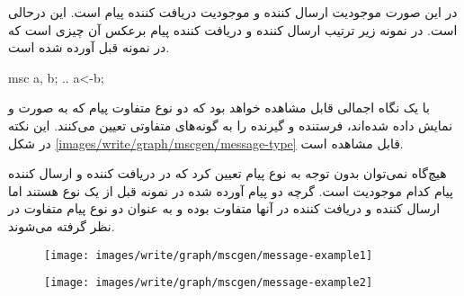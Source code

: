 در این صورت موجودیت  ارسال کننده و موجودیت  دریافت کننده پیام است.
این درحالی است. در نمونه زیر ترتیب ارسال کننده و دریافت کننده پیام برعکس آن چیزی
است که در نمونه قبل آورده شده است.

\begin{MSC}
msc {
	a, b;
	..
	a<-b;
}
\end{MSC}

با یک نگاه اجمالی قابل مشاهده خواهد بود که دو نوع متفاوت پیام که به صورت \lr{->}
و \lr{<-} نمایش داده شده‌اند، فرستنده و گیرنده را به گونه‌های متفاوتی تعیین
می‌کنند. این نکته در شکل \ref{images/write/graph/mscgen/message-type}
قابل مشاهده است. 

\begin{note}
هیچ‌گاه نمی‌توان بدون توجه به نوع پیام تعیین کرد که در  دریافت کننده و ارسال کننده پیام کدام موجودیت است. گرچه دو پیام آورده شده
در نمونه  قبل از یک نوع هستند اما ارسال کننده و دریافت کننده در آنها متفاوت بوده
و به عنوان دو نوع پیام متفاوت در نظر گرفته می‌شوند.
\end{note}

\begin{figure}
                \centering
                \texttt{[image: images/write/graph/mscgen/message-example1]}
                \label{images/write/graph/mscgen/message-example1}
\end{figure}
%         
\begin{figure}
                \centering
                \texttt{[image: images/write/graph/mscgen/message-example2]}
                \label{images/write/graph/mscgen/message-example2}
\end{figure}

